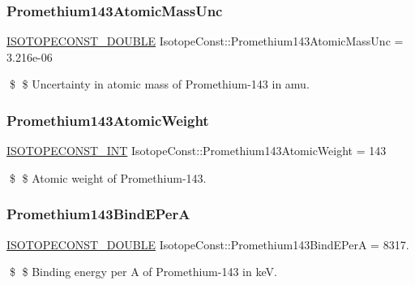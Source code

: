 \subsubsection{\texorpdfstring{Promethium143\+Atomic\+Mass\+Unc}{Promethium143AtomicMassUnc}}
{\footnotesize\ttfamily \mbox{\hyperlink{group___isotope_const-_macros_ga8f45a7272ce02c0b4c65c44636ed719a}{I\+S\+O\+T\+O\+P\+E\+C\+O\+N\+S\+T\+\_\+\+D\+O\+U\+B\+LE}} Isotope\+Const\+::\+Promethium143\+Atomic\+Mass\+Unc = 3.\+216e-\/06}

\$ \$ Uncertainty in atomic mass of Promethium-\/143 in amu. \mbox{\label{group___isotope_const-_promethium-_pm143_gaa507a319735b05d2bf0e0d992bcd7c50}} 
\subsubsection{\texorpdfstring{Promethium143\+Atomic\+Weight}{Promethium143AtomicWeight}}
{\footnotesize\ttfamily \mbox{\hyperlink{group___isotope_const-_macros_ga5f18360b3e99483a35c32d789e62621c}{I\+S\+O\+T\+O\+P\+E\+C\+O\+N\+S\+T\+\_\+\+I\+NT}} Isotope\+Const\+::\+Promethium143\+Atomic\+Weight = 143}

\$ \$ Atomic weight of Promethium-\/143. \mbox{\label{group___isotope_const-_promethium-_pm143_ga9c304aa726685d114064a81c3017e2ba}} 
\subsubsection{\texorpdfstring{Promethium143\+Bind\+E\+PerA}{Promethium143BindEPerA}}
{\footnotesize\ttfamily \mbox{\hyperlink{group___isotope_const-_macros_ga8f45a7272ce02c0b4c65c44636ed719a}{I\+S\+O\+T\+O\+P\+E\+C\+O\+N\+S\+T\+\_\+\+D\+O\+U\+B\+LE}} Isotope\+Const\+::\+Promethium143\+Bind\+E\+PerA = 8317.}

\$ \$ Binding energy per A of Promethium-\/143 in keV. \mbox{\label{group___isotope_const-_promethium-_pm143_ga840f7a6e6c6236fd2e8c80d339e31643}} 
